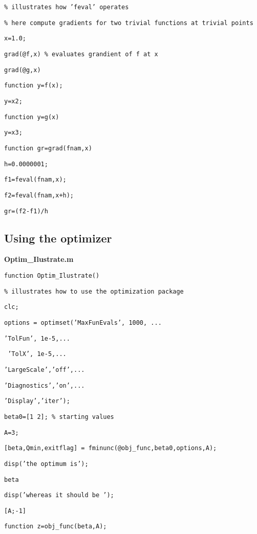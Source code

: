 \documentclass[12pt,a4paper]{article}
\begin{document}
\texttt{\% illustrates how 'feval' operates}

\texttt{\% here compute gradients for two trivial functions at trivial points%
}

\texttt{x=1.0;}

\texttt{grad(@f,x) \% evaluates grandient of f at x}

\texttt{grad(@g,x)}

\texttt{function y=f(x);}

\texttt{y=x2;}

\texttt{function y=g(x)}

\texttt{y=x3;}

\texttt{function gr=grad(fnam,x)}

\texttt{h=0.0000001;}

\texttt{f1=feval(fnam,x);}

\texttt{f2=feval(fnam,x+h);}

\texttt{gr=(f2-f1)/h}

\subsection{\protect\bigskip Using the optimizer}

\bigskip \textbf{Optim\_Ilustrate.m}

\texttt{function Optim\_Ilustrate()}

\texttt{\% illustrates how to use the optimization package}

\texttt{clc;}

\texttt{options = optimset('MaxFunEvals', 1000, ...}

\texttt{'TolFun', 1e-5,...}

\texttt{\ 'TolX', 1e-5,...}

\texttt{'LargeScale','off',...}

\texttt{'Diagnostics','on',...}

\texttt{'Display','iter');}

\texttt{beta0=[1 2]; \% starting values}

\texttt{A=3;}

\texttt{[beta,Qmin,exitflag] = fminunc(@obj\_func,beta0,options,A);}

\texttt{disp('the optimum is');}

\texttt{beta}

\texttt{disp('whereas it should be ');}

\texttt{[A;-1]}

\texttt{function z=obj\_func(beta,A);}
\end{document}
